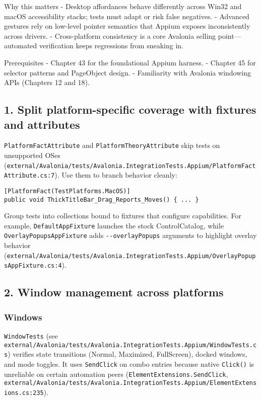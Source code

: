 Why this matters - Desktop affordances behave differently across Win32
and macOS accessibility stacks; tests must adapt or risk false
negatives. - Advanced gestures rely on low-level pointer semantics that
Appium exposes inconsistently across drivers. - Cross-platform
consistency is a core Avalonia selling point---automated verification
keeps regressions from sneaking in.

Prerequisites - Chapter 43 for the foundational Appium harness. -
Chapter 45 for selector patterns and PageObject design. - Familiarity
with Avalonia windowing APIs (Chapters 12 and 18).

\subsection{1. Split platform-specific coverage with fixtures and
attributes}\label{split-platform-specific-coverage-with-fixtures-and-attributes}

\passthrough{\lstinline!PlatformFactAttribute!} and
\passthrough{\lstinline!PlatformTheoryAttribute!} skip tests on
unsupported OSes
(\passthrough{\lstinline!external/Avalonia/tests/Avalonia.IntegrationTests.Appium/PlatformFactAttribute.cs:7!}).
Use them to branch behavior cleanly:

\begin{lstlisting}
[PlatformFact(TestPlatforms.MacOS)]
public void ThickTitleBar_Drag_Reports_Moves() { ... }
\end{lstlisting}

Group tests into collections bound to fixtures that configure
capabilities. For example, \passthrough{\lstinline!DefaultAppFixture!}
launches the stock ControlCatalog, while
\passthrough{\lstinline!OverlayPopupsAppFixture!} adds
\passthrough{\lstinline!--overlayPopups!} arguments to highlight overlay
behavior
(\passthrough{\lstinline!external/Avalonia/tests/Avalonia.IntegrationTests.Appium/OverlayPopupsAppFixture.cs:4!}).

\subsection{2. Window management across
platforms}\label{window-management-across-platforms}

\subsubsection{Windows}\label{windows-5}

\passthrough{\lstinline!WindowTests!} (see
\passthrough{\lstinline!external/Avalonia/tests/Avalonia.IntegrationTests.Appium/WindowTests.cs!})
verifies state transitions (Normal, Maximized, FullScreen), docked
windows, and mode toggles. It uses \passthrough{\lstinline!SendClick!}
on combo entries because native \passthrough{\lstinline!Click()!} is
unreliable on certain automation peers
(\passthrough{\lstinline!ElementExtensions.SendClick!},
\passthrough{\lstinline!external/Avalonia/tests/Avalonia.IntegrationTests.Appium/ElementExtensions.cs:235!}).

